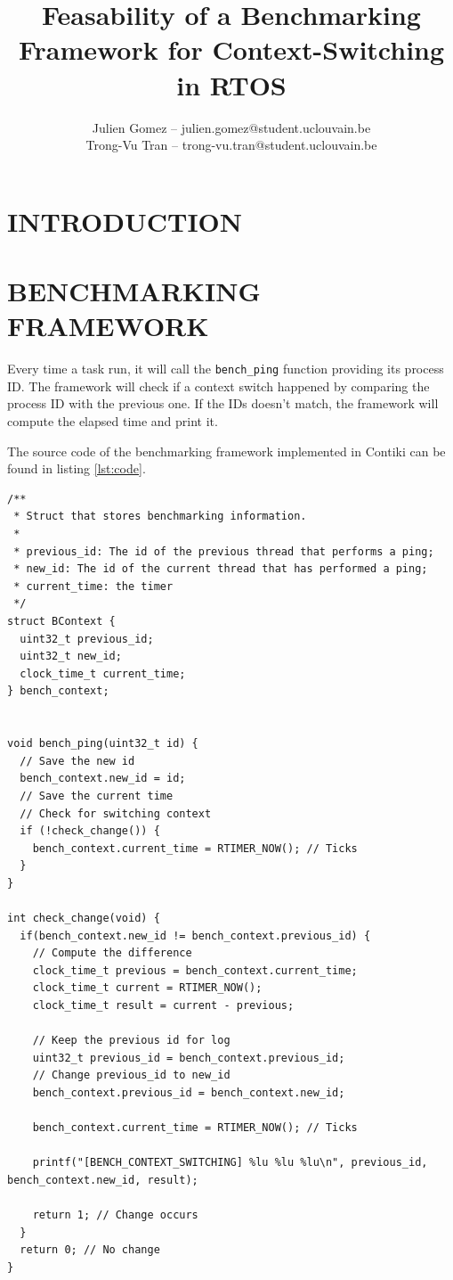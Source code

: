 \documentclass[a4paper, 10pt, conference]{ieeeconf}      %
\title{\LARGE \bf
Feasability of a Benchmarking Framework for Context-Switching in RTOS
}
\author{Julien Gomez -- julien.gomez@student.uclouvain.be
\\ Trong-Vu Tran -- trong-vu.tran@student.uclouvain.be}
\begin{document}
\maketitle
\thispagestyle{empty}
\pagestyle{empty}


\begin{abstract}
\end{abstract}


\section{INTRODUCTION}

\section{BENCHMARKING FRAMEWORK}

Every time a task run, it will call the \texttt{bench\_ping} function providing its process ID.
The framework will check if a context switch happened by comparing the process ID with the previous one.
If the IDs doesn't match, the framework will compute the elapsed time and print it.

The source code of the benchmarking framework implemented in Contiki can be found in listing \ref{lst:code}.

\begin{lstlisting}[style=CStyle, label={lst:code}, caption={Source code of the benchmarking framework implemented in Contiki}]
/**
 * Struct that stores benchmarking information.
 * 
 * previous_id: The id of the previous thread that performs a ping;
 * new_id: The id of the current thread that has performed a ping;
 * current_time: the timer
 */
struct BContext {
  uint32_t previous_id;
  uint32_t new_id;
  clock_time_t current_time;
} bench_context;


void bench_ping(uint32_t id) {
  // Save the new id
  bench_context.new_id = id;
  // Save the current time
  // Check for switching context
  if (!check_change()) {
    bench_context.current_time = RTIMER_NOW(); // Ticks
  }
}

int check_change(void) {
  if(bench_context.new_id != bench_context.previous_id) {
    // Compute the difference
    clock_time_t previous = bench_context.current_time;
    clock_time_t current = RTIMER_NOW();
    clock_time_t result = current - previous;

    // Keep the previous id for log
    uint32_t previous_id = bench_context.previous_id;
    // Change previous_id to new_id
    bench_context.previous_id = bench_context.new_id;

    bench_context.current_time = RTIMER_NOW(); // Ticks

    printf("[BENCH_CONTEXT_SWITCHING] %lu %lu %lu\n", previous_id, bench_context.new_id, result);
    
    return 1; // Change occurs
  }
  return 0; // No change
}
\end{lstlisting}
\end{document}
